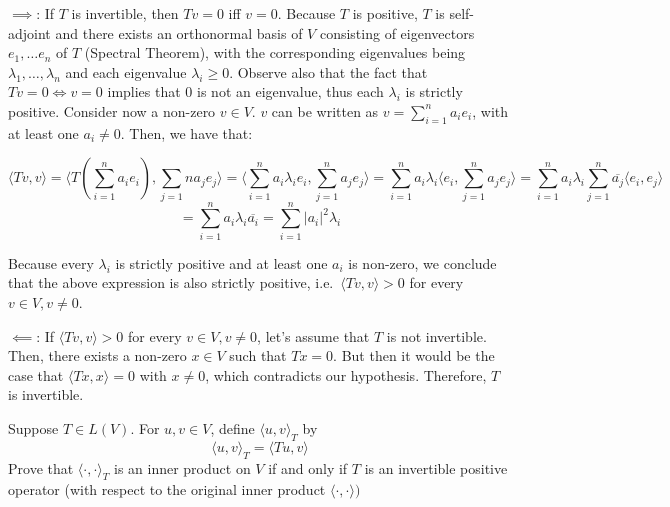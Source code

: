 \begin{solution}

    $\implies$: If $T$ is invertible, then $Tv = 0$ iff $v = 0$. Because $T$ is positive, $T$ is self-adjoint and there exists an orthonormal basis of $V$ consisting of eigenvectors $e_1, \ldots e_n$ of $T$ (Spectral Theorem), with the corresponding eigenvalues being $\lambda_1, \ldots, \lambda_n$ and each eigenvalue $\lambda_i \geq 0$. Observe also that the fact that $Tv = 0 \iff v = 0$ implies that $0$ is not an eigenvalue, thus each $\lambda_i$ is strictly positive. Consider now a non-zero $v \in V$. $v$ can be written as $v = \sum_{i=1}^{n}a_ie_i$, with at least one $a_i \neq 0$. Then, we have that:

    $$\langle Tv, v \rangle = \langle T( \sum_{i=1}^{n}a_ie_i),  \sum_{j=1}{n}a_je_j \rangle = \langle \sum_{i=1}^{n}a_i \lambda_i e_i, \sum_{j=1}^{n}a_je_j \rangle = \sum_{i=1}^{n}a_i \lambda_i \langle e_i, \sum_{j=1}^{n}a_je_j \rangle =  \sum_{i=1}^{n}a_i \lambda_i \sum_{j=1}^{n}\overline{a_j} \langle e_i, e_j \rangle$$
    $$ = \sum_{i=1}^{n}a_i \lambda_i \overline{a_i} = \sum_{i=1}^{n} \lvert a_i \rvert^2 \lambda_i$$

    Because every $\lambda_i$ is strictly positive and at least one $a_i$ is non-zero, we conclude that the above expression is also strictly positive, i.e.\ $\langle Tv, v \rangle > 0$ for every $v \in V, v \neq 0$.

    $\impliedby$: If $\langle Tv, v \rangle > 0$ for every $v \in V, v \neq 0$, let's assume that $T$ is not invertible. Then, there exists a non-zero $x \in V$ such that $Tx = 0$. But then it would be the case that $\langle Tx, x \rangle = 0$ with $x \neq 0$, which contradicts our hypothesis. Therefore, $T$ is invertible.
\end{solution}

\begin{exercise}{8}
    Suppose $T \in L(V)$. For $u, v \in V$, define $\langle u, v \rangle_{T}$ by 
    $$\langle u, v \rangle_{T} = \langle Tu, v \rangle$$
    Prove that $\langle \cdot, \cdot \rangle_{T}$ is an inner product on $V$ if and only if $T$ is an invertible positive operator (with respect to the original inner product $\langle \cdot, \cdot \rangle)$
\end{exercise}

